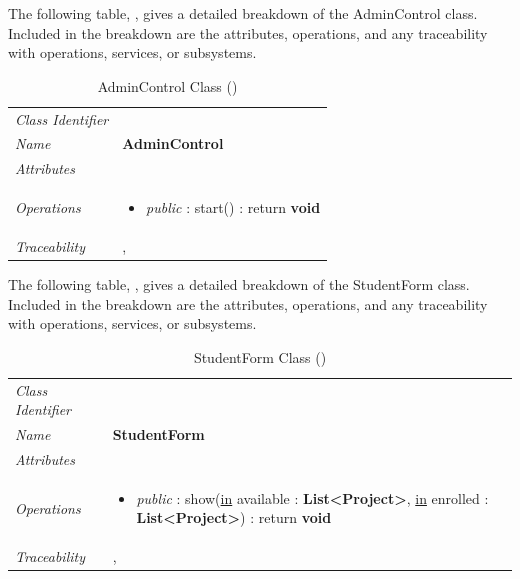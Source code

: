 \documentclass[12pt,letterpaper]{article}
\begin{document}
\newpage{}
The following table, , gives a detailed breakdown of the AdminControl class. Included in the breakdown are the attributes, operations, and any traceability with operations, services, or subsystems.

\begin{table}[H]
    \caption{AdminControl Class ()} 
	\begin{tabu} to 
		\toprule
		Class Identifier &  \\
		Name & {\bf AdminControl} \\
		Attributes & \\

		Operations &
		\begin{minipage}[t]{\linewidth}
			\begin{itemize}
			    \item {\it public} : start() : return {\bf void}
	        \end{itemize}
	    \end{minipage} \\
	    	Traceability & , \\
		\toprule
	\end{tabu}
\end{table}

The following table, , gives a detailed breakdown of the StudentForm class. Included in the breakdown are the attributes, operations, and any traceability with operations, services, or subsystems.

\begin{table}[H]
    \caption{StudentForm Class ()} 
	\begin{tabu} to 
		\toprule
		Class Identifier &  \\
		Name & {\bf StudentForm} \\
		Attributes & \\

		Operations &
		\begin{minipage}[t]{\linewidth}
			\begin{itemize}
			    \item {\it public} : show(\underline{in} available : {\bf List<Project>}, \underline{in} enrolled : {\bf List<Project>}) : return {\bf void}
	        \end{itemize}
	    \end{minipage} \\
	    	Traceability & ,  \\
		\toprule
	\end{tabu}
\end{table}
\end{document}
